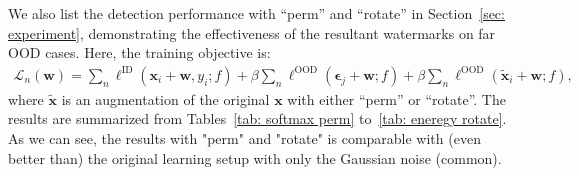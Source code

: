 \documentclass{article}
\begin{document}
{We also list the detection performance with ``perm'' and ``rotate'' in Section~\ref{sec: experiment}, demonstrating the effectiveness of the resultant watermarks on far OOD cases. Here, the training objective is:}
\begin{align}
    {\mathcal{L}_n(\boldsymbol{w})=\sum_n \ell^\text{ID}(\boldsymbol{x}_i + \boldsymbol{w},y_i;f) + \beta \sum_n \ell^\text{OOD}(\boldsymbol{\epsilon}_j+ \boldsymbol{w};f) + \beta \sum_n \ell^\text{OOD}(\boldsymbol{\tilde{x}}_i+ \boldsymbol{w};f),} \label{eq: objective v2}
\end{align}
{where $\boldsymbol{\tilde{x}}$ is an augmentation of the original $\boldsymbol{x}$ with either ``perm'' or ``rotate''. The results are summarized from Tables~\ref{tab: softmax perm} to~\ref{tab: eneregy rotate}. As we can see, the results with "perm" and "rotate" is comparable with (even better than) the original learning setup with only the Gaussian noise (common). }
\end{document}

